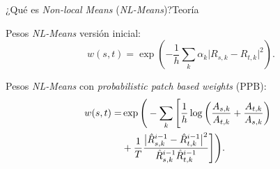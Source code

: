 \documentclass[fleqn,10pt]{beamer}
\newcommand\blfootnote[1]{%
	\begingroup
	\renewcommand\thefootnote{}\footnote{#1}%
	\addtocounter{footnote}{-1}%
	\endgroup
}
\begin{document}
\begin{frame}{¿Qué es \emph{Non-local Means} (\emph{NL-Means})?}{Teoría}
\begin{multicols}{2}
		\pause
		{\footnotesize Pesos \emph{NL-Means} versión inicial:}
		{\scriptsize \begin{equation*}
			w(s,t) = \exp\left(-\frac{1}{h} \sum_k \alpha_k \lvert R_{s,k}-R_{t,k} \rvert^2 \right).
			\end{equation*}}
		
		\pause
		{\footnotesize Pesos \emph{NL-Means} con \emph{probabilistic patch based weights} (PPB):}
		{\scriptsize \begin{align*}
			\hspace*{-0.25cm}w(s,t) =&  \exp\Bigg( -\sum_{k}\Bigg[ \frac{1}{h} \log \left(\frac{A_{s,k}}{A_{t,k}} + \frac{A_{t,k}}{A_{s,k}}\right)\\
			& + \frac{1}{T} \frac{\big\lvert\hat{R}^{i-1}_{s,k} - \hat{R}^{i-1}_{t,k}\big\rvert^2}{\hat{R}^{i-1}_{s,k}\hat{R}^{i-1}_{t,k}} \Bigg]\Bigg).
			\end{align*}}
		
	\end{multicols}
\end{frame}

%	

%	
%	
\end{document}
